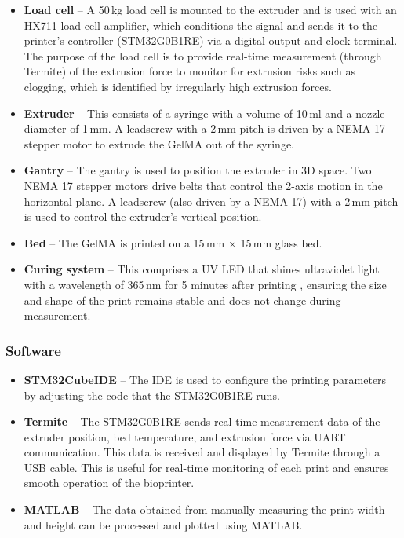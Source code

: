 \begin{itemize}
    \item \textbf{Load cell} – A 50\,kg load cell is mounted to the extruder and is used with an HX711 load cell amplifier, which conditions the signal and sends it to the printer’s controller (STM32G0B1RE) via a digital output and clock terminal. The purpose of the load cell is to provide real-time measurement (through Termite) of the extrusion force to monitor for extrusion risks such as clogging, which is identified by irregularly high extrusion forces.
    
    \item \textbf{Extruder} – This consists of a syringe with a volume of 10\,ml and a nozzle diameter of 1\,mm. A leadscrew with a 2\,mm pitch is driven by a NEMA 17 stepper motor to extrude the GelMA out of the syringe.
    
    \item \textbf{Gantry} – The gantry is used to position the extruder in 3D space. Two NEMA 17 stepper motors drive belts that control the 2-axis motion in the horizontal plane. A leadscrew (also driven by a NEMA 17) with a 2\,mm pitch is used to control the extruder’s vertical position.
    
    \item \textbf{Bed} – The GelMA is printed on a 15\,mm $\times$ 15\,mm glass bed.
    
    \item \textbf{Curing system} – This comprises a UV LED that shines ultraviolet light with a wavelength of 365\,nm for 5 minutes after printing \cite{gelma_protocol}, ensuring the size and shape of the print remains stable and does not change during measurement.
\end{itemize}

\subsubsection*{Software}

\begin{itemize}
    \item \textbf{STM32CubeIDE} – The IDE is used to configure the printing parameters by adjusting the code that the STM32G0B1RE runs.

    \item \textbf{Termite} – The STM32G0B1RE sends real-time measurement data of the extruder position, bed temperature, and extrusion force via UART communication. This data is received and displayed by Termite through a USB cable. This is useful for real-time monitoring of each print and ensures smooth operation of the bioprinter.

    \item \textbf{MATLAB} – The data obtained from manually measuring the print width and height can be processed and plotted using MATLAB.
\end{itemize}


